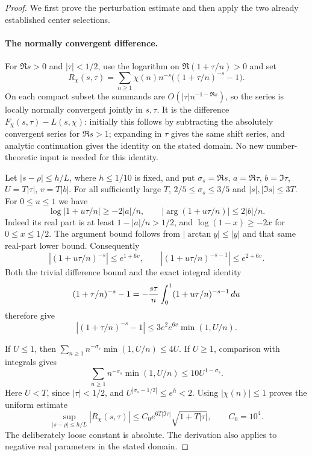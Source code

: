\begin{proof}
We first prove the perturbation estimate and then apply the two
already established center selections.

\paragraph{The normally convergent difference.}
For $\Re s>0$ and $|\tau|<1/2$, use the logarithm on
$\Re(1+\tau/n)>0$ and set
\[
 R_\chi(s,\tau)=\sum_{n\ge1}\chi(n)n^{-s}
             \bigl((1+\tau/n)^{-s}-1\bigr).
\tag{A049r.5}
\]
On each compact subset the summands are
$O(|\tau|n^{-1-\Re s})$, so the series is locally normally
convergent jointly in $s,\tau$. It is the difference
$F_\chi(s,\tau)-L(s,\chi)$: initially this follows by subtracting
the absolutely convergent series for $\Re s>1$; expanding in $\tau$
gives the same shift series, and analytic continuation gives the
identity on the stated domain. No new number-theoretic input is
needed for this identity.

Let $|s-\rho|\le h/L$, where $h\le1/10$ is fixed, and put
$\sigma_s=\Re s$, $a=\Re\tau$, $b=\Im\tau$,
$U=T|\tau|$, $v=T|b|$. For all sufficiently large $T$,
$2/5\le\sigma_s\le3/5$ and $|s|,|\Im s|\le3T$.
For $0\le u\le1$ we have
\[
 \log|1+u\tau/n|\ge-2|a|/n,\qquad
 |\arg(1+u\tau/n)|\le2|b|/n.
\tag{A049r.6}
\]
Indeed its real part is at least $1-|a|/n>1/2$, and
$\log(1-x)\ge-2x$ for $0\le x\le1/2$.
The argument bound follows from
$|\arctan y|\le|y|$ and that same real-part lower bound.
Consequently
\[
 |(1+u\tau/n)^{-s}|\le e^{1+6v},\qquad
 |(1+u\tau/n)^{-s-1}|\le e^{2+6v}.
\]
Both the trivial difference bound and the exact integral identity
\[
 (1+\tau/n)^{-s}-1
       =-{s\tau\over n}\int_0^1(1+u\tau/n)^{-s-1}\,du
\]
therefore give
\[
 |(1+\tau/n)^{-s}-1|
           \le3e^2 e^{6v}\min(1,U/n).
\tag{A049r.7}
\]

If $U\le1$, then
$\sum_{n\ge1}n^{-\sigma_s}\min(1,U/n)\le4U$.
If $U\ge1$, comparison with integrals gives
\[
 \sum_{n\ge1}n^{-\sigma_s}\min(1,U/n)
                          \le10U^{1-\sigma_s}.
\]
Here $U<T$, since $|\tau|<1/2$, and
$U^{|\sigma_s-1/2|}\le e^h<2$. Using $|\chi(n)|\le1$
proves the uniform estimate
\[
 \sup_{|s-\rho|\le h/L}|R_\chi(s,\tau)|
        \le C_0 e^{6T|\Im\tau|}\sqrt{1+T|\tau|},
                  \qquad C_0=10^4.
\tag{A049r.8}
\]
The deliberately loose constant is absolute. The derivation also
applies to negative real parameters in the stated domain.


\end{proof}
